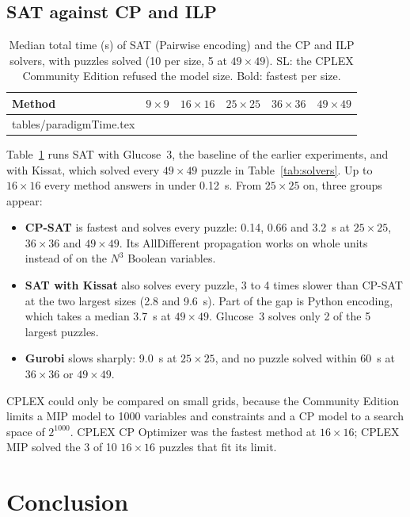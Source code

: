 \subsection{SAT against CP and ILP}

\begin{table}[t]
\caption{Median total time (s) of SAT (Pairwise encoding) and the CP and ILP solvers, with puzzles solved (10 per size, 5 at $49\times49$). SL: the CPLEX Community Edition refused the model size. Bold: fastest per size.}\label{tab:paradigms}
\centering\small
\begin{tabular}{lrrrrr}
\toprule
Method & $9\times9$ & $16\times16$ & $25\times25$ & $36\times36$ & $49\times49$ \\
\midrule
{} tables/paradigmTime.tex 
\bottomrule
\end{tabular}
\end{table}

Table~\ref{tab:paradigms} runs SAT with Glucose~3, the baseline of the earlier experiments, and with Kissat, which solved every $49\times49$ puzzle in Table~\ref{tab:solvers}. Up to $16\times16$ every method answers in under 0.12~s. From $25\times25$ on, three groups appear:
\begin{itemize}
\item \textbf{CP-SAT} is fastest and solves every puzzle: 0.14, 0.66 and 3.2~s at $25\times25$, $36\times36$ and $49\times49$. Its $\mathrm{AllDifferent}$ propagation works on whole units instead of on the $N^3$ Boolean variables.
\item \textbf{SAT with Kissat} also solves every puzzle, 3 to 4 times slower than CP-SAT at the two largest sizes (2.8 and 9.6~s). Part of the gap is Python encoding, which takes a median 3.7~s at $49\times49$. Glucose~3 solves only 2 of the 5 largest puzzles.
\item \textbf{Gurobi} slows sharply: 9.0~s at $25\times25$, and no puzzle solved within 60~s at $36\times36$ or $49\times49$.
\end{itemize}
CPLEX could only be compared on small grids, because the Community Edition limits a MIP model to 1000 variables and constraints and a CP model to a search space of $2^{1000}$. CPLEX CP Optimizer was the fastest method at $16\times16$; CPLEX MIP solved the 3 of 10 $16\times16$ puzzles that fit its limit.

\section{Conclusion}\label{sec:conclusion}

